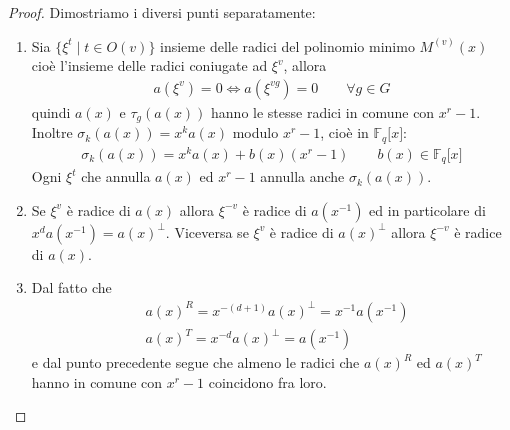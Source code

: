 \begin{proof}
   Dimostriamo i diversi punti separatamente:
   \begin{enumerate}
      \item Sia $\lbrace \xi^{t} \mid t \in O(v) \rbrace$ insieme delle radici del polinomio minimo $M^{(v)}(x)$ cioè l'insieme delle radici coniugate ad $\xi^{v}$, allora
      \begin{align*}
         a(\xi^{v}) = 0 \iff a(\xi^{vg}) = 0 \qquad \forall g \in G
      \end{align*}
      quindi $a(x)$ e $\tau_{g}(a(x))$ hanno le stesse radici in comune con $x^r-1$. \\
      Inoltre $\sigma_{k}(a(x)) = x^ka(x)$ modulo $x^r-1$, cioè in $\mathbb{F}_{q}\lbrack x \rbrack$:
      \begin{align*}
         \sigma_{k}(a(x)) = x^ka(x) + b(x)(x^r-1)  \qquad b(x)\in \mathbb{F}_{q}\lbrack x \rbrack
      \end{align*}
      Ogni $\xi^{t}$ che annulla $a(x)$ ed $x^r-1$ annulla anche $\sigma_{k}(a(x))$.
      \item Se $\xi^{v}$ è radice di $a(x)$ allora $\xi^{-v}$ è radice di $a(x^{-1})$ ed in particolare di $x^{d}a(x^{-1}) = a(x)^{\perp}$. Viceversa se $\xi^{v}$ è radice di $ a(x)^{\perp}$ allora $\xi^{-v}$ è radice di $a(x)$.
      \item Dal fatto che
        \begin{align*}
	  & a(x)^{R} = x^{-(d+1)} a(x)^{\perp} = x^{-1}a(x^{-1}) \\
	  & a(x)^{T} = x^{-d} a(x)^{\perp} = a(x^{-1})
	\end{align*}
      e dal punto precedente segue che almeno le radici che $a(x)^{R}$ ed $a(x)^{T}$ hanno in comune con $x^r -1$ coincidono fra loro.






\end{enumerate}
\end{proof}
